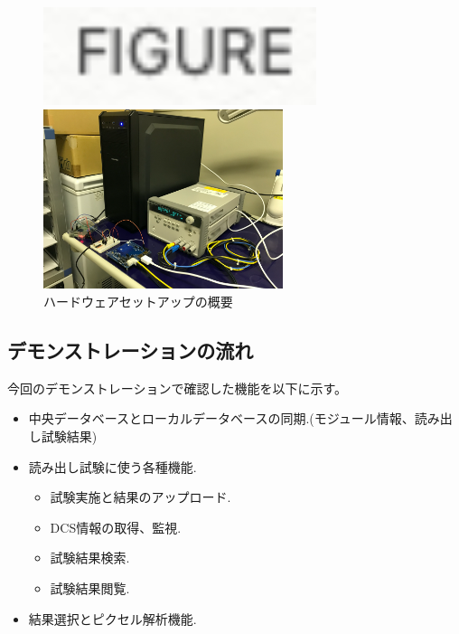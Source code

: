 \begin{figure}[bpt]\centering
  \begin{minipage}{0.5\hsize}
    \includegraphics[width=8cm]{figure}
  \end{minipage}
  \begin{minipage}{0.5\hsize}
    \includegraphics[width=7cm]{HW_setup_pic}
  \end{minipage}
\caption[ハードウェアセットアップの概要]{ハードウェアセットアップの概要}
\label{readout_setup_overview}
\end{figure}


\subsection{デモンストレーションの流れ}

今回のデモンストレーションで確認した機能を以下に示す。
\begin{itemize}
  \item 中央データベースとローカルデータベースの同期.(モジュール情報、読み出し試験結果)
  \item 読み出し試験に使う各種機能.
   \begin{itemize}
     \item 試験実施と結果のアップロード.
     \item DCS情報の取得、監視.
     \item 試験結果検索.
     \item 試験結果閲覧.
   \end{itemize}
  \item 結果選択とピクセル解析機能.
\end{itemize}

